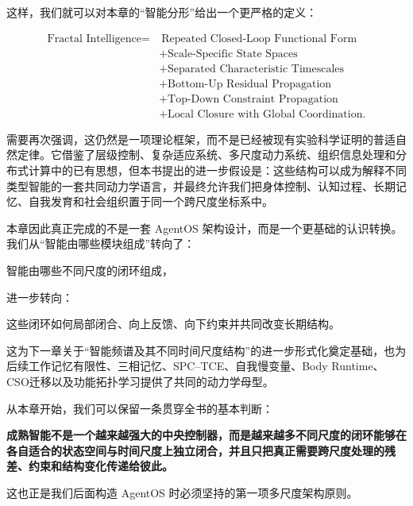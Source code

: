 这样，我们就可以对本章的“智能分形”给出一个更严格的定义：

\[
\boxed{
\begin{aligned}
\text{Fractal Intelligence}
=
&\ \text{Repeated Closed-Loop Functional Form}\\
&+\text{Scale-Specific State Spaces}\\
&+\text{Separated Characteristic Timescales}\\
&+\text{Bottom-Up Residual Propagation}\\
&+\text{Top-Down Constraint Propagation}\\
&+\text{Local Closure with Global Coordination}.
\end{aligned}
}
\]

需要再次强调，这仍然是一项理论框架，而不是已经被现有实验科学证明的普适自然定律。它借鉴了层级控制、复杂适应系统、多尺度动力系统、组织信息处理和分布式计算中的已有思想，但本书提出的进一步假设是：这些结构可以成为解释不同类型智能的一套共同动力学语言，并最终允许我们把身体控制、认知过程、长期记忆、自我发育和社会组织置于同一个跨尺度坐标系中。

本章因此真正完成的不是一套 AgentOS 架构设计，而是一个更基础的认识转换。我们从“智能由哪些模块组成”转向了：

\begin{statementbox}
智能由哪些不同尺度的闭环组成，
\end{statementbox}
进一步转向：
\begin{statementbox}
这些闭环如何局部闭合、向上反馈、向下约束并共同改变长期结构。
\end{statementbox}

这为下一章关于“智能频谱及其不同时间尺度结构”的进一步形式化奠定基础，也为后续工作记忆有限性、三相记忆、SPC--TCE、自我慢变量、Body Runtime、CSO迁移以及功能拓扑学习提供了共同的动力学母型。

从本章开始，我们可以保留一条贯穿全书的基本判断：

\begin{proposition*}
\bfseries
成熟智能不是一个越来越强大的中央控制器，而是越来越多不同尺度的闭环能够在各自适合的状态空间与时间尺度上独立闭合，并且只把真正需要跨尺度处理的残差、约束和结构变化传递给彼此。
\end{proposition*}

这也正是我们后面构造 AgentOS 时必须坚持的第一项多尺度架构原则。
